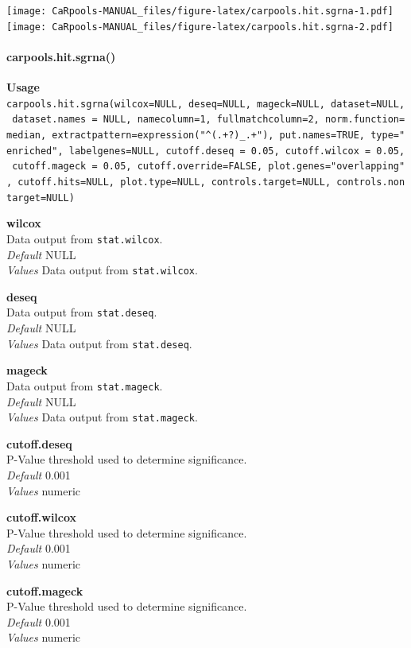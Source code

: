 \documentclass[]{article}
\let\oldparagraph\paragraph
\renewcommand{\paragraph}[1]{\oldparagraph{#1}\mbox{}}
\begin{document}
\texttt{[image: CaRpools-MANUAL\_files/figure-latex/carpools.hit.sgrna-1.pdf]}
\texttt{[image: CaRpools-MANUAL\_files/figure-latex/carpools.hit.sgrna-2.pdf]}

\paragraph{carpools.hit.sgrna()}\label{carpools.hit.sgrna}

\textbf{Usage}\\
\texttt{carpools.hit.sgrna(wilcox=NULL,\ deseq=NULL,\ mageck=NULL,\ dataset=NULL,\ dataset.names\ =\ NULL,\ namecolumn=1,\ fullmatchcolumn=2,\ norm.function=median,\ extractpattern=expression("\^{}(.+?)\_.+"),\ put.names=TRUE,\ type="enriched",\ labelgenes=NULL,\ cutoff.deseq\ =\ 0.05,\ cutoff.wilcox\ =\ 0.05,\ cutoff.mageck\ =\ 0.05,\ cutoff.override=FALSE,\ plot.genes="overlapping",\ cutoff.hits=NULL,\ plot.type=NULL,\ controls.target=NULL,\ controls.nontarget=NULL)}

\textbf{wilcox}\\
Data output from \texttt{stat.wilcox}.\\
\emph{Default} NULL\\
\emph{Values} Data output from \texttt{stat.wilcox}.

\textbf{deseq}\\
Data output from \texttt{stat.deseq}.\\
\emph{Default} NULL\\
\emph{Values} Data output from \texttt{stat.deseq}.

\textbf{mageck}\\
Data output from \texttt{stat.mageck}.\\
\emph{Default} NULL\\
\emph{Values} Data output from \texttt{stat.mageck}.

\textbf{cutoff.deseq}\\
P-Value threshold used to determine significance.\\
\emph{Default} 0.001\\
\emph{Values} numeric

\textbf{cutoff.wilcox}\\
P-Value threshold used to determine significance.\\
\emph{Default} 0.001\\
\emph{Values} numeric

\textbf{cutoff.mageck}\\
P-Value threshold used to determine significance.\\
\emph{Default} 0.001\\
\emph{Values} numeric
\end{document}
